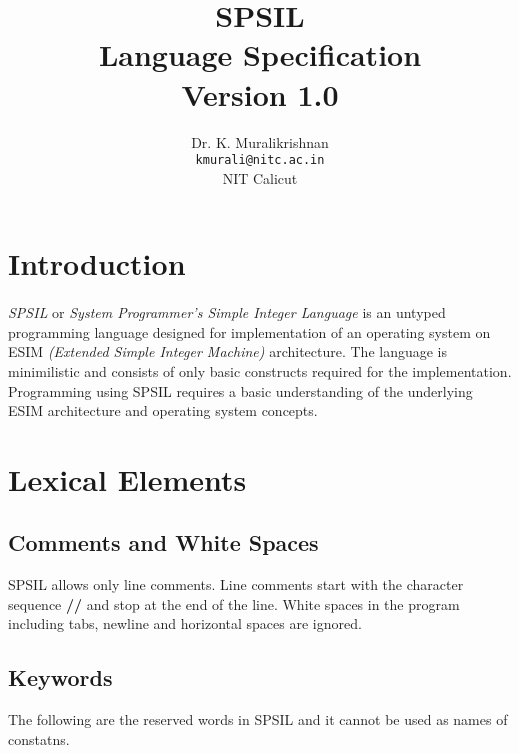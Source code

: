 \documentclass[11pt]{article}
\title{SPSIL \\ Language Specification \\
Version 1.0}
\author{Dr. K. Muralikrishnan  \\ \texttt{kmurali@nitc.ac.in} \\ {NIT Calicut} }
\begin{document}
 \newcommand{\kw}[1]{\texttt{#1}}

\maketitle

\pagebreak
\thispagestyle{plain}

\tableofcontents
\pagebreak


\section{Introduction}
\paragraph{}
\textit{SPSIL} or \textit{System Programmer's Simple Integer Language} is an untyped programming language designed for implementation of an operating system on ESIM \textit{(Extended Simple Integer Machine)} architecture. The language is minimilistic and consists of only basic constructs required for the implementation. Programming using SPSIL requires a  basic understanding of the underlying ESIM architecture and operating system concepts. 



\section{Lexical Elements}




\subsection{Comments and White Spaces}

SPSIL allows only line comments. Line comments start with the character sequence \textbf{//} and stop at the end of the line. 
White spaces in the program including tabs, newline and horizontal spaces are ignored.


\subsection{Keywords}
The following are the reserved words in SPSIL and it cannot be used as names of constatns.
\end{document}
